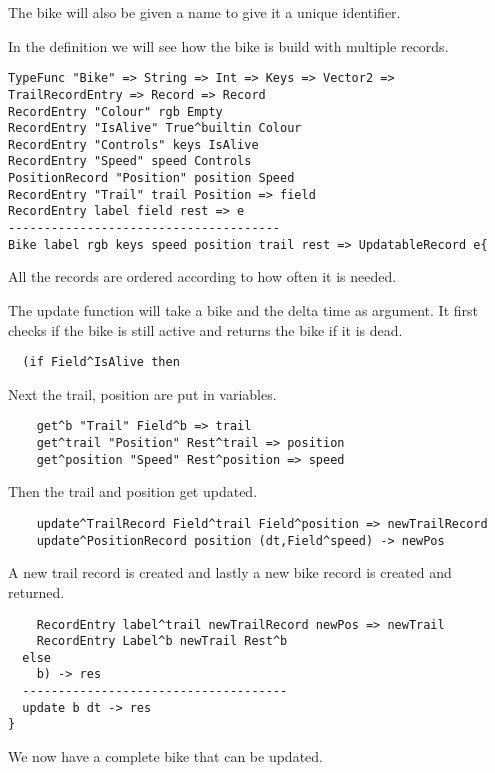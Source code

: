 The bike will also be given a name to give it a unique identifier.

In the definition we will see how the bike is build with multiple records.

\begin{lstlisting}
TypeFunc "Bike" => String => Int => Keys => Vector2 => TrailRecordEntry => Record => Record
RecordEntry "Colour" rgb Empty
RecordEntry "IsAlive" True^builtin Colour
RecordEntry "Controls" keys IsAlive
RecordEntry "Speed" speed Controls
PositionRecord "Position" position Speed
RecordEntry "Trail" trail Position => field
RecordEntry label field rest => e
--------------------------------------
Bike label rgb keys speed position trail rest => UpdatableRecord e{
\end{lstlisting}

All the records are ordered according to how often it is needed.

The update function will take a bike and the delta time as argument.
It first checks if the bike is still active and returns the bike if it is dead.

\begin{lstlisting}
  (if Field^IsAlive then
\end{lstlisting}

Next the trail, position are put in variables.

\begin{lstlisting}
    get^b "Trail" Field^b => trail
    get^trail "Position" Rest^trail => position
    get^position "Speed" Rest^position => speed
\end{lstlisting}

Then the trail and position get updated.

\begin{lstlisting}
    update^TrailRecord Field^trail Field^position => newTrailRecord
    update^PositionRecord position (dt,Field^speed) -> newPos
\end{lstlisting}

A new trail record is created and lastly a new bike record is created and returned.

\begin{lstlisting}
    RecordEntry label^trail newTrailRecord newPos => newTrail
    RecordEntry Label^b newTrail Rest^b
  else
    b) -> res
  -------------------------------------
  update b dt -> res
}
\end{lstlisting}

We now have a complete bike that can be updated.


